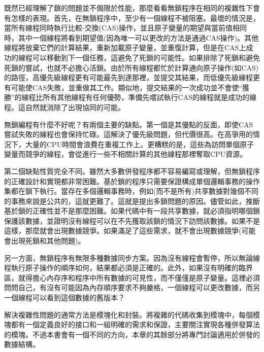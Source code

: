 既然已經理解了鎖的問題並不侷限於性能，那麼看看無鎖程序在相同的複雜性下會有怎樣的表現。首先，在無鎖程序中，至少有一個線程不被阻塞。最壞的情況是，當所有線程同時執行比較-交換(CAS)操作，並且原子變量的期望與當前值相同時，其中一個線程將看到期望值(因為唯一可以更改的方法是通過CAS操作)。其他線程將放棄它們的計算結果，重新加載原子變量，並重復計算，但是在CAS上成功的線程可以移動到下一個任務，這避免了死鎖的可能性。如果排除了死鎖和避免死鎖的嘗試，也就不必擔心活鎖。由於所有線程都忙於計算通向原子操作(如CAS)的路徑，高優先級線程更有可能最先到達那裡，並提交其結果，而低優先級線程更有可能使CAS失敗，並重做其工作。類似地，提交結果的一次成功並不會使“獲勝”的線程比所有其他線程有任何優勢，準備先嚐試執行CAS的線程就是成功的線程。這自然就消除了出現協同的可能。

無鎖編程有什麼不好呢？有兩個主要的缺點。第一個是其優點的反面，即使CAS嘗試失敗的線程也會保持忙碌。這解決了優先級問題，但代價很高。在高爭用的情況下，大量的CPU時間會浪費在重複工作上。更糟糕的是，這些為訪問單個原子變量而競爭的線程，會從進行一些不相關計算的其他線程那裡奪取CPU資源。

第二個缺點性質完全不同。雖然大多數併發程序都不容易編寫或理解，但無鎖程序的正確設計和實現都非常困難。基於鎖的程序只需要保證構成單個邏輯事務的操作集都在鎖下執行。當存在多個邏輯事務時，例如(而不是所有)共享數據對幾個不同的事務來說是公共的，這就更難了。這就是提出多鎖問題的原因。儘管如此，推斷基於鎖的正確性並不是那麼困難。如果代碼中有一段共享數據，就必須指明哪個鎖保護該數據，並證明沒有線程可以在不先獲取該鎖的情況下訪問該數據。如果不是這樣，那麼就會出現數據競爭。如果滿足了這些需求，就不會出現數據競爭(可能會出現死鎖和其他問題)。

另一方面，無鎖程序有無限多種數據同步方案。因為沒有線程會暫停，所以無論線程執行原子操作的順序如何，結果都必須是正確的。此外，如果沒有明確的臨界區，就得擔心內存序和程序中所有數據的可見性，而不僅僅是原子變量。這裡必須問問自己，有沒有可能因為內存順序要求不夠嚴格，一個線程可以更改數據，而另一個線程可以看到這個數據的舊版本？

解決複雜性問題的通常方法是模塊化和封裝。將複雜的代碼收集到模塊中，每個模塊都有一個定義良好的接口和一組明確的需求和保證，主要關注實現各種併發算法的模塊。不過本書會有一個不同的方向，本章的其餘部分將專門討論適用於併發的數據結構。




































